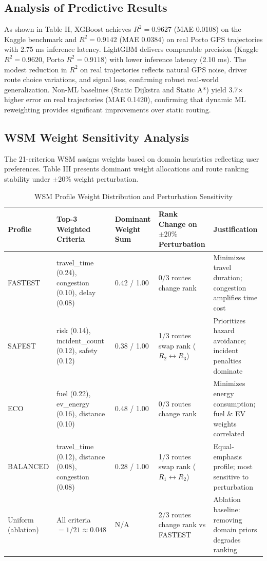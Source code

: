 \documentclass[journal]{IEEEtran}
\begin{document}
\subsection{Analysis of Predictive Results}
As shown in Table II, XGBoost achieves $R^2 = 0.9627$ (MAE 0.0108) on the Kaggle benchmark and $R^2 = 0.9142$ (MAE 0.0384) on real Porto GPS trajectories with 2.75 ms inference latency. LightGBM delivers comparable precision (Kaggle $R^2 = 0.9620$, Porto $R^2 = 0.9118$) with lower inference latency (2.10 ms). The modest reduction in $R^2$ on real trajectories reflects natural GPS noise, driver route choice variations, and signal loss, confirming robust real-world generalization. Non-ML baselines (Static Dijkstra and Static A*) yield 3.7$\times$ higher error on real trajectories (MAE 0.1420), confirming that dynamic ML reweighting provides significant improvements over static routing.

\subsection{WSM Weight Sensitivity Analysis}
The 21-criterion WSM assigns weights based on domain heuristics reflecting user preferences. Table III presents dominant weight allocations and route ranking stability under $\pm20\%$ weight perturbation.

\begin{table}[t]
\centering
\caption{WSM Profile Weight Distribution and Perturbation Sensitivity}
\label{tab:wsm_sensitivity}
\begin{tabular}{lllll}
\toprule
\textbf{Profile} & \textbf{Top-3 Weighted Criteria} & \textbf{Dominant Weight Sum} & \textbf{Rank Change on $\pm20\%$ Perturbation} & \textbf{Justification} \\
\midrule
FASTEST & travel\_time (0.24), congestion (0.10), delay (0.08) & 0.42 / 1.00 & 0/3 routes change rank & Minimizes travel duration; congestion amplifies time cost \\
SAFEST & risk (0.14), incident\_count (0.12), safety (0.12) & 0.38 / 1.00 & 1/3 routes swap rank ($R_2 \leftrightarrow R_3$) & Prioritizes hazard avoidance; incident penalties dominate \\
ECO & fuel (0.22), ev\_energy (0.16), distance (0.10) & 0.48 / 1.00 & 0/3 routes change rank & Minimizes energy consumption; fuel \& EV weights correlated \\
BALANCED & travel\_time (0.12), distance (0.08), congestion (0.08) & 0.28 / 1.00 & 1/3 routes swap rank ($R_1 \leftrightarrow R_2$) & Equal-emphasis profile; most sensitive to perturbation \\
Uniform (ablation) & All criteria $= 1/21 \approx 0.048$ & N/A & 2/3 routes change rank vs FASTEST & Ablation baseline: removing domain priors degrades ranking \\
\bottomrule
\end{tabular}
\end{table}
\end{document}
